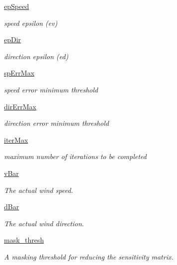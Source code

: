 \begin{DoxyCompactItemize}
\mbox{\hyperlink{namespace_reduced_s_m_aa4f3b7b9255fe90c846c6e42d57ab5f1}{ep\+Speed}}
\begin{DoxyCompactList}\small\item\em speed epsilon (ev) \end{DoxyCompactList}\item 
\mbox{\hyperlink{namespace_reduced_s_m_a2e00f0fe37b83224dc19800e4eb332a4}{ep\+Dir}}
\begin{DoxyCompactList}\small\item\em direction epsilon (ed) \end{DoxyCompactList}\item 
\mbox{\hyperlink{namespace_reduced_s_m_a4d41ef5243c51b6b27a644ddd5984879}{sp\+Err\+Max}}
\begin{DoxyCompactList}\small\item\em speed error minimum threshold \end{DoxyCompactList}\item 
\mbox{\hyperlink{namespace_reduced_s_m_ae6a8b93203810f4021fccd67a05f51e7}{dir\+Err\+Max}}
\begin{DoxyCompactList}\small\item\em direction error minimum threshold \end{DoxyCompactList}\item 
\mbox{\hyperlink{namespace_reduced_s_m_aef5d3f10407f244dce4feddcf7947ed3}{iter\+Max}}
\begin{DoxyCompactList}\small\item\em maximum number of iterations to be completed \end{DoxyCompactList}\item 
\mbox{\hyperlink{namespace_reduced_s_m_a0e80246040e2942e9ccee8ec8ee7313c}{v\+Bar}}
\begin{DoxyCompactList}\small\item\em The actual wind speed. \end{DoxyCompactList}\item 
\mbox{\hyperlink{namespace_reduced_s_m_a54a76d567f185562d0afbd302b2764ab}{d\+Bar}}
\begin{DoxyCompactList}\small\item\em The actual wind direction. \end{DoxyCompactList}\item 
\mbox{\hyperlink{namespace_reduced_s_m_a2a76625af709255ac745eda01a83142a}{mask\+\_\+thresh}}
\begin{DoxyCompactList}\small\item\em A masking threshold for reducing the sensitivity matrix. \end{DoxyCompactList}\end{DoxyCompactItemize}


